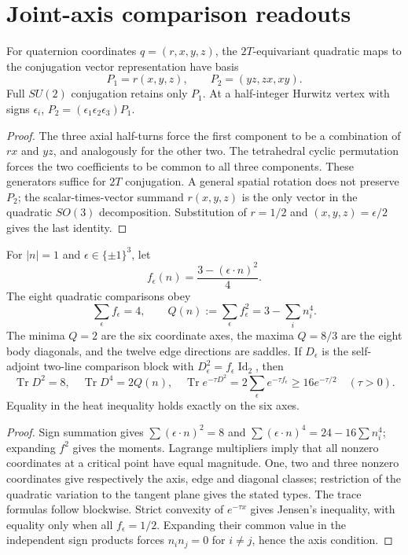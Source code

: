\documentclass[11pt]{article}
\begin{document}
\section{Joint-axis comparison readouts}
\label{p1:app:joint-axis-comparison-readouts}

\begin{proposition}
\label{p1:prop:finite-quadratic-covariant-space}
For quaternion coordinates \(q=(r,x,y,z)\), the \(2T\)-equivariant
quadratic maps to the conjugation vector representation have basis
\[
 P_1=r(x,y,z),\qquad P_2=(yz,zx,xy).
\]
Full \(SU(2)\) conjugation retains only \(P_1\).  At a half-integer
Hurwitz vertex with signs \(\epsilon_i\),
\(P_2=(\epsilon_1\epsilon_2\epsilon_3)P_1\).
\end{proposition}
\begin{proof}
The three axial half-turns force the first component to be a
combination of \(rx\) and \(yz\), and analogously for the other two.
The tetrahedral cyclic permutation forces the two coefficients to be
common to all three components.  These generators suffice for \(2T\)
conjugation.  A general spatial rotation does not preserve \(P_2\);
the scalar-times-vector summand \(r(x,y,z)\) is the only vector in the
quadratic \(SO(3)\) decomposition.  Substitution of \(r=1/2\) and
\((x,y,z)=\epsilon/2\) gives the last identity.
\end{proof}

\begin{theorem}
\label{p1:thm:joint-axis-moments-heat}
For \(|n|=1\) and \(\epsilon\in\{\pm1\}^3\), let
\[
 f_\epsilon(n)=\frac{3-(\epsilon\cdot n)^2}{4}.
\]
The eight quadratic comparisons obey
\[
 \sum_\epsilon f_\epsilon=4,\qquad
 Q(n):=\sum_\epsilon f_\epsilon^2=3-\sum_i n_i^4.
\]
The minima \(Q=2\) are the six coordinate axes, the maxima \(Q=8/3\)
are the eight body diagonals, and the twelve edge directions are
saddles.  If \(D_\epsilon\) is the self-adjoint two-line comparison
block with \(D_\epsilon^2=f_\epsilon\operatorname{Id}_2\), then
\[
 \operatorname{Tr}D^2=8,\quad \operatorname{Tr}D^4=2Q(n),\quad
 \operatorname{Tr}e^{-\tau D^2}
     =2\sum_\epsilon e^{-\tau f_\epsilon}
     \geq16e^{-\tau/2}\quad(\tau>0).
\]
Equality in the heat inequality holds exactly on the six axes.
\end{theorem}
\begin{proof}
Sign summation gives
\(\sum(\epsilon\cdot n)^2=8\) and
\(\sum(\epsilon\cdot n)^4=24-16\sum n_i^4\); expanding \(f^2\)
gives the moments.  Lagrange multipliers imply that all nonzero
coordinates at a critical point have equal magnitude.  One, two and
three nonzero coordinates give respectively the axis, edge and
diagonal classes; restriction of the quadratic variation to the
tangent plane gives the stated types.  The trace formulas follow
blockwise.  Strict convexity of \(e^{-\tau x}\) gives Jensen's
inequality, with equality only when all \(f_\epsilon=1/2\).
Expanding their common value in the independent sign products forces
\(n_in_j=0\) for \(i\ne j\), hence the axis condition.
\end{proof}
\end{document}

